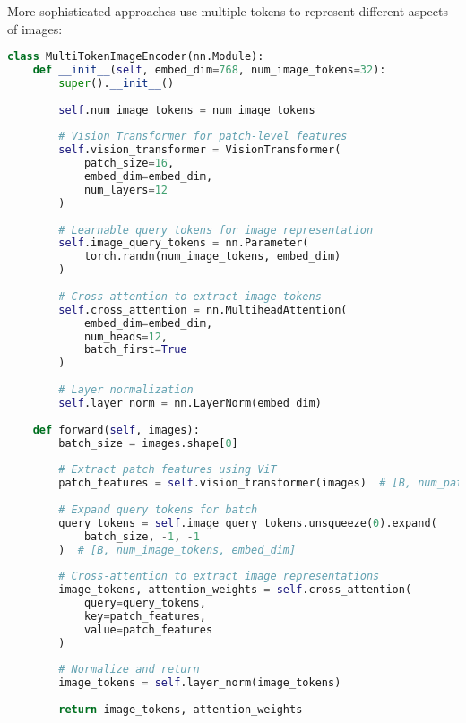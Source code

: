 More sophisticated approaches use multiple tokens to represent different aspects of images:
\begin{comment}
Feedback: Before the code, it's helpful to explain the motivation for this more complex approach. For example: "While a single image token is simple, it can create an information bottleneck, forcing the entire visual content into one vector. A multi-token approach, inspired by query mechanisms in models like Flamingo or BLIP-2, allows the model to extract a richer, more fine-grained representation of the image, where different tokens might learn to focus on different objects or aspects of the scene."
\end{comment}

\begin{lstlisting}[language=Python, caption=Multi-token image representation]
class MultiTokenImageEncoder(nn.Module):
    def __init__(self, embed_dim=768, num_image_tokens=32):
        super().__init__()
        
        self.num_image_tokens = num_image_tokens
        
        # Vision Transformer for patch-level features
        self.vision_transformer = VisionTransformer(
            patch_size=16,
            embed_dim=embed_dim,
            num_layers=12
        )
        
        # Learnable query tokens for image representation
        self.image_query_tokens = nn.Parameter(
            torch.randn(num_image_tokens, embed_dim)
        )
        
        # Cross-attention to extract image tokens
        self.cross_attention = nn.MultiheadAttention(
            embed_dim=embed_dim,
            num_heads=12,
            batch_first=True
        )
        
        # Layer normalization
        self.layer_norm = nn.LayerNorm(embed_dim)
    
    def forward(self, images):
        batch_size = images.shape[0]
        
        # Extract patch features using ViT
        patch_features = self.vision_transformer(images)  # [B, num_patches, embed_dim]
        
        # Expand query tokens for batch
        query_tokens = self.image_query_tokens.unsqueeze(0).expand(
            batch_size, -1, -1
        )  # [B, num_image_tokens, embed_dim]
        
        # Cross-attention to extract image representations
        image_tokens, attention_weights = self.cross_attention(
            query=query_tokens,
            key=patch_features,
            value=patch_features
        )
        
        # Normalize and return
        image_tokens = self.layer_norm(image_tokens)
        
        return image_tokens, attention_weights
\end{lstlisting}


